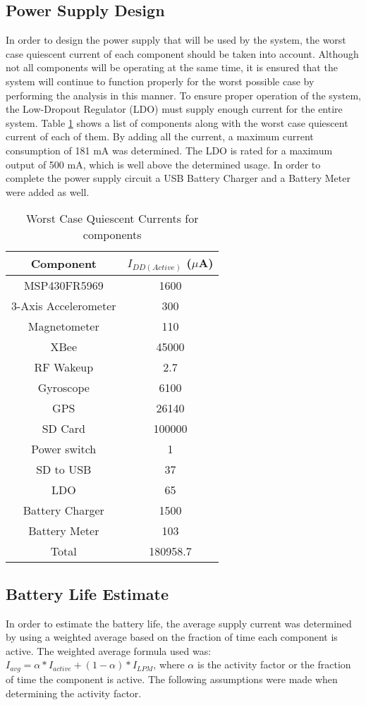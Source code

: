 \subsection{Power Supply Design}
In order to design the power supply that will be used by the system, the worst case quiescent current of each component should be taken into account.  Although not all components will be operating at the same time, it is ensured that the system will continue to function properly for the worst possible case by performing the analysis in this manner.  To ensure proper operation of the system, the Low-Dropout Regulator (LDO) must supply enough current for the entire system.  Table \ref{tab:powerSupply} shows a list of components along with the worst case quiescent current of each of them.  By adding all the current, a maximum current consumption of 181 mA was determined.  The LDO is rated for a maximum output of 500 mA, which is well above the determined usage. In order to complete the power supply circuit a USB Battery Charger and a Battery Meter were added as well.  
\begin{table}[H]
  \centering
  \caption{Worst Case Quiescent Currents for components}
    \begin{tabular}{|c|c|}
     \hline
    Component & $I_{DD(Active)}$ ($\mu$A) \\
     \hline \hline
    MSP430FR5969 & 1600   \\ \hline
    3-Axis Accelerometer & 300  \\ \hline
    Magnetometer & 110  \\ \hline
    XBee  & 45000 \\ \hline
    RF Wakeup & 2.7   \\ \hline
    Gyroscope & 6100  \\ \hline
    GPS   & 26140 \\ \hline
    SD Card & 100000  \\ \hline
    Power switch & 1  \\ \hline
    SD to USB & 37   \\ \hline
    LDO   & 65  \\ \hline
    Battery Charger & 1500  \\ \hline
    Battery Meter & 103   \\ \hline \hline
    Total & 180958.7  \\ \hline     
    \end{tabular}%
  \label{tab:powerSupply}%
\end{table}%

\subsection{Battery Life Estimate}
In order to estimate the battery life, the average supply current was determined by using a weighted average based on the fraction of time each component is active.  The weighted average formula used was: $I_{avg} = \alpha * I_{active} + (1 - \alpha) * I_{LPM}$, where $\alpha$ is the activity factor or the fraction of time the component is active.  The following assumptions were made when determining the activity factor.

